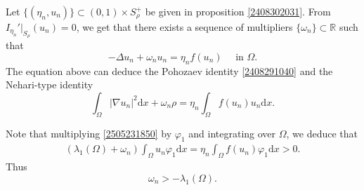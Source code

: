 \documentclass[10pt]{article}
\numberwithin{equation}{section}
\newcommand{\ud}{\mathrm{d}}
\numberwithin{equation}{section}
\begin{document}
Let $\{(\eta_n, u_n)\}\subset (0, 1)\times S_\rho^+$ be given in proposition \ref{2408302031}. From  $I_{\eta_n}'|_{S_\rho}(u_n)=0$, we get that there exists a sequence of multipliers $\{\omega_n\}\subset \mathbb{R}$ such that
\begin{equation}\label{2505231850}
-\Delta u_n+\omega_n u_n=\eta_nf(u_n) \quad\text { in } \Omega.
\end{equation}
The equation above can deduce the Pohozaev identity \eqref{2408291040} 
and the Nehari-type identity
\begin{equation}\label{2408291041}
\int_{\Omega}|\nabla u_n|^2 \ud x+\omega_n\rho=\eta_n\int_{\Omega}f(u_n)u_n \ud x.
\end{equation}

 Note that multiplying \eqref{2505231850} by $\varphi_{1}$ and integrating over $\Omega$, we deduce that
\begin{equation*}
\begin{aligned}
(\lambda_1(\Omega)+\omega_n)\int_{\Omega} u_n\varphi_{1} \ud x
=\eta_n\int_{\Omega}f(u_n)\varphi_{1} \ud x>0.
\end{aligned}
\end{equation*}
Thus
\begin{equation}\label{2510092110}
\omega_n>-\lambda_1(\Omega).
\end{equation}
\end{document}
